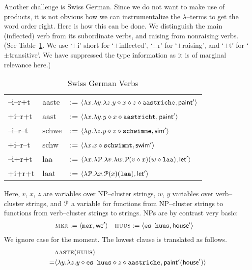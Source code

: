 Another challenge is Swiss German. Since we do not want to make
use of products, it is not obvious how we can instrumentalize
the $\lambda$--terms to get the word order right. Here is how
this can be done. We distinguish the main (inflected) verb from
its subordinate verbs, and raising from nonraising verbs.
(See Table~\ref{tab:swissgerman}. We use `$\pm$i' short for 
`$\pm$inflected', `$\pm$r' for `$\pm$raising', and `$\pm$t' for 
`$\pm$transitive'. We have suppressed the type information as 
it is of marginal relevance here.)
\begin{table}
\caption{Swiss German Verbs}
\label{tab:swissgerman}
\begin{center}
\begin{tabular}{lll}
--i--r+t & {\sc aaste} & := $\langle\lambda x.\lambda y. \lambda z.
    y \diamond x \diamond z \diamond \mbox{\tt aastriche},
        \mbox{\sf paint}'\rangle$ \\
+i--r+t & {\sc aast} & := $\langle\lambda x.\lambda y.y \diamond
    x \diamond \mbox{\tt aastricht}, \mbox{\sf paint}'\rangle$ \\
--i--r--t & {\sc schwe} & := $\langle\lambda y. \lambda z.
    y \diamond z \diamond \mbox{\tt schwimme},
        \mbox{\sf sim}'\rangle$ \\
+i--r--t & {\sc schw} & := $\langle\lambda x.x \diamond \mbox{\tt schwimmt},
    \mbox{\sf swim}'\rangle$ \\
--i+r+t & {\sc laa} & := $\langle\lambda x. \lambda \mathcal{P}. \lambda v.\lambda w.
    \mathcal{P}(v \diamond x)(w \diamond \mbox{\tt laa}), \mbox{\sf let}'\rangle$ \\
+i+r+t & {\sc laat} & :=  
	$\langle\lambda \mathcal{P}. \lambda x.\mathcal{P}(x)(\mbox{\tt laa}),
    \mbox{\sf let}'\rangle$
\end{tabular}
\end{center}
\end{table}
Here, $v$, $x$, $z$ are variables over NP--cluster strings, $w$, 
$y$ variables over verb--cluster strings, and $\mathcal{P}$ a variable for 
functions from NP--cluster strings to functions from verb--cluster 
strings to strings. NPs are by contrast very basic:
\begin{align}
\mbox{\sc mer} & := \langle \mbox{\tt mer}, \mathsf{we}'\rangle &
\mbox{\sc huus} & := \langle \mbox{\tt es huus}, \mathsf{house}'\rangle
\end{align}
We ignore case for the moment.
The lowest clause is translated as follows.
\begin{align}
& \mbox{\sc aaste}(\mbox{\sc huus}) \\\notag
= & \langle \lambda y.\lambda z. y \diamond
    \mbox{\tt es huus} \diamond z \diamond \mbox{\tt aastriche}, 
   \mbox{\sf paint}'(\mbox{\sf house}')\rangle
\end{align}
